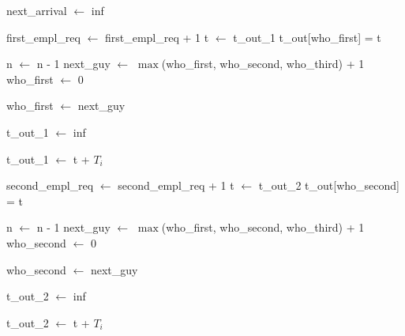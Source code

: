 \documentclass{article}
\newenvironment{allintypewriter}{\ttfamily}{\par}
\begin{document}
\begin{allintypewriter}
\begin{algorithmic}[1]

                             
                                \State next\_arrival $\gets$ inf
                            \EndIf

                            \State first\_empl\_req $\gets$ first\_empl\_req + 1
                            \State t $\gets$ t\_out\_1
                            \State t\_out[who\_first] = t

                            \State n $\gets$ n - 1
                            \State next\_guy $\gets$ $\max$(who\_first, who\_second, who\_third) + 1
                            \State who\_first $\gets$ 0 

                                \State who\_first $\gets$ next\_guy
                            \EndIf

                                \State t\_out\_1 $\gets$ inf

                            \Else
                                \State t\_out\_1 $\gets$ t + $T_i$ 
                            \EndIf

                            \State second\_empl\_req $\gets$ second\_empl\_req + 1
                            \State t $\gets$ t\_out\_2
                            \State t\_out[who\_second] = t

                            \State n $\gets$ n - 1
                            \State next\_guy $\gets$ $\max$(who\_first, who\_second, who\_third) + 1
                            \State who\_second $\gets$ 0 

                                \State who\_second $\gets$ next\_guy
                            \EndIf

                                \State t\_out\_2 $\gets$ inf

                            \Else
                                \State t\_out\_2 $\gets$ t + $T_i$ 
                            \EndIf


\end{algorithmic}
\end{allintypewriter}
\end{document}
